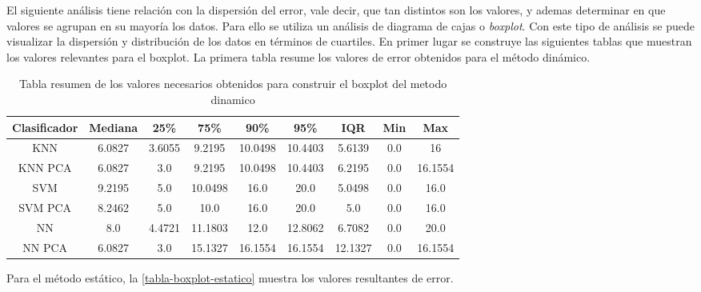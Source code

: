 El siguiente análisis tiene relación con la dispersión del error, vale decir, que tan distintos son los valores, y ademas determinar en que valores se agrupan en su mayoría los datos. Para ello se utiliza un análisis de diagrama de cajas o \textit{boxplot}. Con este tipo de análisis se puede visualizar la dispersión y distribución de los datos en términos de cuartiles. En primer lugar se construye las siguientes tablas que muestran los valores relevantes para el boxplot. La primera tabla resume los valores de error obtenidos para el método dinámico.

\begin{table}[!h]
\centering
\caption{Tabla resumen de los valores necesarios obtenidos para construir el boxplot del metodo dinamico}
\label{tabla-boxplot-dinamico}
\begin{tabular}{|c|c|c|c|c|c|c|c|c|}
\hline
\textbf{Clasificador} & \textbf{Mediana} & \textbf{25\%} & \textbf{75\%} & \textbf{90\%} & \textbf{95\%} & \textbf{IQR} & \textbf{Min} & \textbf{Max} \\ \hline
KNN                   & 6.0827           & 3.6055        & 9.2195        & 10.0498       & 10.4403       & 5.6139       & 0.0            & 16           \\ \hline
KNN PCA               & 6.0827           & 3.0           & 9.2195        & 10.0498       & 10.4403       & 6.2195       & 0.0          & 16.1554      \\ \hline
SVM                   & 9.2195           & 5.0           & 10.0498       & 16.0          & 20.0          & 5.0498       & 0.0          & 16.0         \\ \hline
SVM PCA               & 8.2462           & 5.0           & 10.0          & 16.0          & 20.0          & 5.0          & 0.0          & 16.0         \\ \hline
NN                    & 8.0              & 4.4721        & 11.1803       & 12.0          & 12.8062       & 6.7082       & 0.0          & 20.0         \\ \hline
NN PCA                & 6.0827           & 3.0           & 15.1327       & 16.1554       & 16.1554       & 12.1327      & 0.0          & 16.1554      \\ \hline
\end{tabular}
\end{table}


Para el método estático, la \autoref{tabla-boxplot-estatico} muestra los valores resultantes de error.

